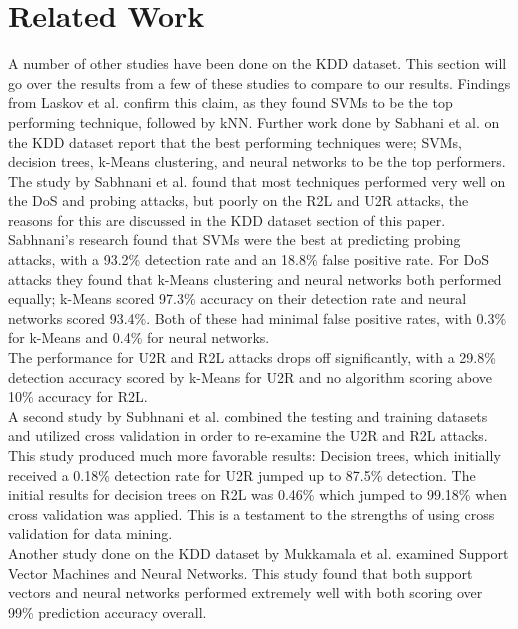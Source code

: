 \documentclass[12pt]{article} %
\begin{document}
\pagebreak

\section{Related Work}
A number of other studies have been done on the KDD dataset. This section will go over the results from a few of these studies to compare to our results. Findings from Laskov et al. confirm this claim, as they found SVMs to be the top performing technique, followed by kNN. Further work done by Sabhani et al. \cite{sabhanai03} \cite{sabhnani04} on the KDD dataset report that the best performing techniques were; SVMs, decision trees, k-Means clustering, and neural networks to be the top performers.\\
The study by Sabhnani et al. found that most techniques performed very well on the DoS and probing attacks, but poorly on the R2L and U2R attacks, the reasons for this are discussed in the KDD dataset section of this paper. Sabhnani's research found that SVMs were the best at predicting probing attacks, with a 93.2\% detection rate and an 18.8\% false positive rate. For DoS attacks they found that k-Means clustering and neural networks both performed equally; k-Means scored 97.3\% accuracy on their detection rate and neural networks scored 93.4\%\cite{sabhanai03}. Both of these had minimal false positive rates, with 0.3\% for k-Means and 0.4\% for neural networks.\\
The performance for U2R and R2L attacks drops off significantly, with a 29.8\% detection accuracy scored by k-Means for U2R and no algorithm scoring above 10\% accuracy for R2L.\\
A second study by Subhnani et al. combined the testing and training datasets and utilized cross validation in order to re-examine the U2R and R2L attacks. This study produced much more favorable results: Decision trees, which initially received a 0.18\% detection rate for U2R jumped up to 87.5\% detection. The initial results for decision trees on R2L was 0.46\% which jumped to 99.18\% when cross validation was applied. This is a testament to the strengths of using cross validation for data mining.\\
Another study done on the KDD dataset by Mukkamala et al. examined Support Vector Machines and Neural Networks. This study found that both support vectors and neural networks performed extremely well with both scoring over 99\% prediction accuracy overall.\\
\end{document}
